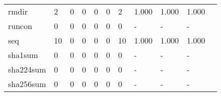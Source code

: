 \begin{longtable}{lp{1.2cm}p{1.2cm}p{1.2cm}p{1.2cm}p{1.2cm}p{1.2cm}p{1.2cm}p{1.2cm}p{1.2cm}p{1.2cm}}
rmdir     &                                     2 &                                                  0 &                                                  0 &                                                  0 &                                                  0 &                                                  2 &                                              1.000 &                                              1.000 &                                              1.000 \\
runcon    &                                     0 &                                                  0 &                                                  0 &                                                  0 &                                                  0 &                                                  0 &                                                  - &                                                  - &                                                  - \\
seq       &                                    10 &                                                  0 &                                                  0 &                                                  0 &                                                  0 &                                                 10 &                                              1.000 &                                              1.000 &                                              1.000 \\
sha1sum   &                                     0 &                                                  0 &                                                  0 &                                                  0 &                                                  0 &                                                  0 &                                                  - &                                                  - &                                                  - \\
sha224sum &                                     0 &                                                  0 &                                                  0 &                                                  0 &                                                  0 &                                                  0 &                                                  - &                                                  - &                                                  - \\
sha256sum &                                     0 &                                                  0 &                                                  0 &                                                  0 &                                                  0 &                                                  0 &                                                  - &                                                  - &                                                  - \\

\end{longtable}
